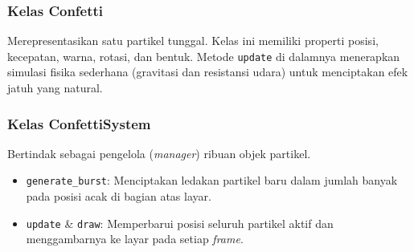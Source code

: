 \subsubsection{Kelas Confetti}
Merepresentasikan satu partikel tunggal. Kelas ini memiliki properti posisi, kecepatan, warna, rotasi, dan bentuk. Metode \texttt{update} di dalamnya menerapkan simulasi fisika sederhana (gravitasi dan resistansi udara) untuk menciptakan efek jatuh yang natural.

\subsubsection{Kelas ConfettiSystem}
Bertindak sebagai pengelola (\textit{manager}) ribuan objek partikel.
\begin{itemize}
    \item \texttt{generate\_burst}: Menciptakan ledakan partikel baru dalam jumlah banyak pada posisi acak di bagian atas layar.
    \item \texttt{update} \& \texttt{draw}: Memperbarui posisi seluruh partikel aktif dan menggambarnya ke layar pada setiap \textit{frame}.
\end{itemize}

\newpage
